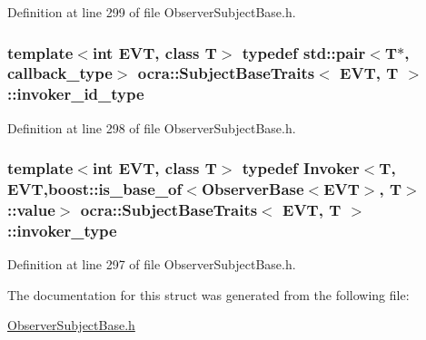 Definition at line 299 of file Observer\+Subject\+Base.\+h.

\subsubsection[{\texorpdfstring{invoker\+\_\+id\+\_\+type}{invoker_id_type}}]{\setlength{\rightskip}{0pt plus 5cm}template$<$int E\+VT, class T$>$ typedef std\+::pair$<$T$\ast$, {\bf callback\+\_\+type}$>$ {\bf ocra\+::\+Subject\+Base\+Traits}$<$ E\+VT, T $>$\+::{\bf invoker\+\_\+id\+\_\+type}}\hypertarget{structocra_1_1SubjectBaseTraits_a2c4f3af9b3e93bf96232c36df6f43986}{}\label{structocra_1_1SubjectBaseTraits_a2c4f3af9b3e93bf96232c36df6f43986}


Definition at line 298 of file Observer\+Subject\+Base.\+h.

\subsubsection[{\texorpdfstring{invoker\+\_\+type}{invoker_type}}]{\setlength{\rightskip}{0pt plus 5cm}template$<$int E\+VT, class T$>$ typedef {\bf Invoker}$<$T, E\+VT,boost\+::is\+\_\+base\+\_\+of$<${\bf Observer\+Base}$<$E\+VT$>$, T$>$\+::value$>$ {\bf ocra\+::\+Subject\+Base\+Traits}$<$ E\+VT, T $>$\+::{\bf invoker\+\_\+type}}\hypertarget{structocra_1_1SubjectBaseTraits_a7d6f024ca6d59f607025916cbb7a3423}{}\label{structocra_1_1SubjectBaseTraits_a7d6f024ca6d59f607025916cbb7a3423}


Definition at line 297 of file Observer\+Subject\+Base.\+h.



The documentation for this struct was generated from the following file\+:\begin{DoxyCompactItemize}
\item 
\hyperlink{ObserverSubjectBase_8h}{Observer\+Subject\+Base.\+h}\end{DoxyCompactItemize}
